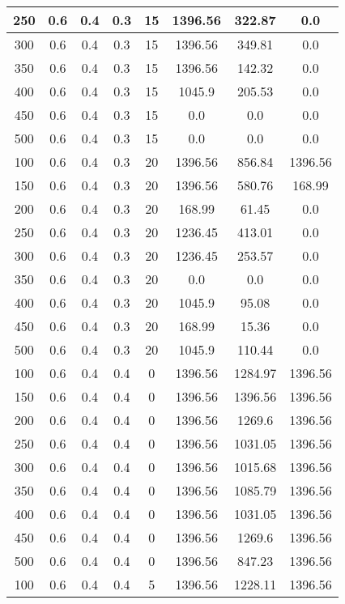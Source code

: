 \documentclass[a4paper, 12pt]{extreport}
\begin{document}
\begin{itemize}
\begin{longtable}{|c|c|c|c|c|c|c|c|}
			250 & 0.6 & 0.4 & 0.3 & 15 & 1396.56 & 322.87 & 0.0 \\\hline
			300 & 0.6 & 0.4 & 0.3 & 15 & 1396.56 & 349.81 & 0.0 \\\hline
			350 & 0.6 & 0.4 & 0.3 & 15 & 1396.56 & 142.32 & 0.0 \\\hline
			400 & 0.6 & 0.4 & 0.3 & 15 & 1045.9 & 205.53 & 0.0 \\\hline
			450 & 0.6 & 0.4 & 0.3 & 15 & 0.0 & 0.0 & 0.0 \\\hline
			500 & 0.6 & 0.4 & 0.3 & 15 & 0.0 & 0.0 & 0.0 \\\hline
			100 & 0.6 & 0.4 & 0.3 & 20 & 1396.56 & 856.84 & 1396.56 \\\hline
			150 & 0.6 & 0.4 & 0.3 & 20 & 1396.56 & 580.76 & 168.99 \\\hline
			200 & 0.6 & 0.4 & 0.3 & 20 & 168.99 & 61.45 & 0.0 \\\hline
			250 & 0.6 & 0.4 & 0.3 & 20 & 1236.45 & 413.01 & 0.0 \\\hline
			300 & 0.6 & 0.4 & 0.3 & 20 & 1236.45 & 253.57 & 0.0 \\\hline
			350 & 0.6 & 0.4 & 0.3 & 20 & 0.0 & 0.0 & 0.0 \\\hline
			400 & 0.6 & 0.4 & 0.3 & 20 & 1045.9 & 95.08 & 0.0 \\\hline
			450 & 0.6 & 0.4 & 0.3 & 20 & 168.99 & 15.36 & 0.0 \\\hline
			500 & 0.6 & 0.4 & 0.3 & 20 & 1045.9 & 110.44 & 0.0 \\\hline
			100 & 0.6 & 0.4 & 0.4 & 0 & 1396.56 & 1284.97 & 1396.56 \\\hline
			150 & 0.6 & 0.4 & 0.4 & 0 & 1396.56 & 1396.56 & 1396.56 \\\hline
			200 & 0.6 & 0.4 & 0.4 & 0 & 1396.56 & 1269.6 & 1396.56 \\\hline
			250 & 0.6 & 0.4 & 0.4 & 0 & 1396.56 & 1031.05 & 1396.56 \\\hline
			300 & 0.6 & 0.4 & 0.4 & 0 & 1396.56 & 1015.68 & 1396.56 \\\hline
			350 & 0.6 & 0.4 & 0.4 & 0 & 1396.56 & 1085.79 & 1396.56 \\\hline
			400 & 0.6 & 0.4 & 0.4 & 0 & 1396.56 & 1031.05 & 1396.56 \\\hline
			450 & 0.6 & 0.4 & 0.4 & 0 & 1396.56 & 1269.6 & 1396.56 \\\hline
			500 & 0.6 & 0.4 & 0.4 & 0 & 1396.56 & 847.23 & 1396.56 \\\hline
			100 & 0.6 & 0.4 & 0.4 & 5 & 1396.56 & 1228.11 & 1396.56 \\\hline

\end{longtable}
\end{itemize}
\end{document}
